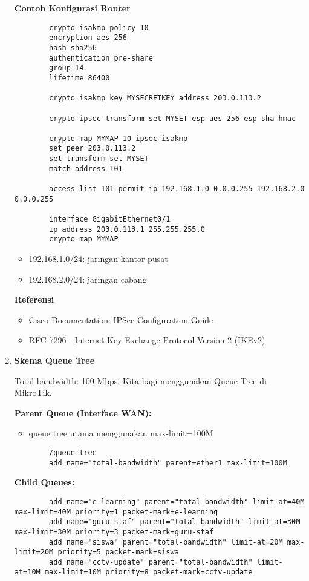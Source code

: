 \begin{enumerate}
	\textbf{Contoh Konfigurasi Router}
	\begin{lstlisting}
		crypto isakmp policy 10
		encryption aes 256
		hash sha256
		authentication pre-share
		group 14
		lifetime 86400

		crypto isakmp key MYSECRETKEY address 203.0.113.2

		crypto ipsec transform-set MYSET esp-aes 256 esp-sha-hmac

		crypto map MYMAP 10 ipsec-isakmp
		set peer 203.0.113.2
		set transform-set MYSET
		match address 101

		access-list 101 permit ip 192.168.1.0 0.0.0.255 192.168.2.0 0.0.0.255

		interface GigabitEthernet0/1
		ip address 203.0.113.1 255.255.255.0
		crypto map MYMAP
	\end{lstlisting}
	\begin{itemize}
		\item 192.168.1.0/24: jaringan kantor pusat
		\item 192.168.2.0/24: jaringan cabang
	\end{itemize}

	\textbf{Referensi}
	\begin{itemize}
		\item Cisco Documentation: \href{https://www.cisco.com/c/en/us/td/docs/ios-xml/ios/sec_conn_vpnips/configuration/xe-16/sec-vpnips-xe-16-book/sec-vpn-site.html}{IPSec Configuration Guide}
		\item RFC 7296 - \href{https://tools.ietf.org/html/rfc7296}{Internet Key Exchange Protocol Version 2 (IKEv2)}
	\end{itemize}

	\item \textbf{Skema Queue Tree}
	
	Total bandwidth: 100 Mbps. Kita bagi menggunakan Queue Tree di MikroTik.

	\textbf{Parent Queue (Interface WAN):}
	\begin{itemize}
		\item queue tree utama menggunakan max-limit=100M
	\end{itemize}
	\begin{lstlisting}
		/queue tree
		add name="total-bandwidth" parent=ether1 max-limit=100M
	\end{lstlisting}

	\textbf{Child Queues:}
	\begin{lstlisting}
		add name="e-learning" parent="total-bandwidth" limit-at=40M max-limit=40M priority=1 packet-mark=e-learning
		add name="guru-staf" parent="total-bandwidth" limit-at=30M max-limit=30M priority=3 packet-mark=guru-staf
		add name="siswa" parent="total-bandwidth" limit-at=20M max-limit=20M priority=5 packet-mark=siswa
		add name="cctv-update" parent="total-bandwidth" limit-at=10M max-limit=10M priority=8 packet-mark=cctv-update
	\end{lstlisting}


\end{enumerate}
